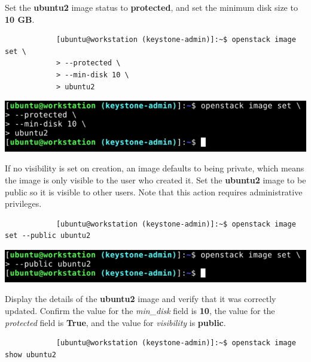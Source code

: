 \documentclass[letterpaper, 12pt]{article}
\begin{document}
\begin{enumerate}
    \begin{labstep}
        Set the \textbf{ubuntu2} image status to \textbf{protected}, and set the minimum disk size to \textbf{10 GB}.
        \begin{lstlisting}
            [ubuntu@workstation (keystone-admin)]:~$ openstack image set \
            > --protected \
            > --min-disk 10 \
            > ubuntu2
        \end{lstlisting}

        \begin{center}
            \includegraphics[width=\linewidth]{images/part1/step21.png}
        \end{center}
    \end{labstep}

    \begin{labstep}
        If no visibility is set on creation, an image defaults to being private, which means the image is only visible to the user who created it.
        Set the \textbf{ubuntu2} image to be public so it is visible to other users.
        Note that this action requires administrative privileges.
        \begin{lstlisting}
            [ubuntu@workstation (keystone-admin)]:~$ openstack image set --public ubuntu2
        \end{lstlisting}

        \begin{center}
            \includegraphics[width=\linewidth]{images/part1/step22.png}
        \end{center}
    \end{labstep}

    \begin{labstep}
        Display the details of the \textbf{ubuntu2} image and verify that it was correctly updated.
        Confirm the value for the \textit{min\_disk} field is \textbf{10}, the value for the \textit{protected} field is \textbf{True}, and the value for \textit{visibility} is \textbf{public}.
        \begin{lstlisting}
            [ubuntu@workstation (keystone-admin)]:~$ openstack image show ubuntu2
        \end{lstlisting}


\end{labstep}
\end{enumerate}
\end{document}

